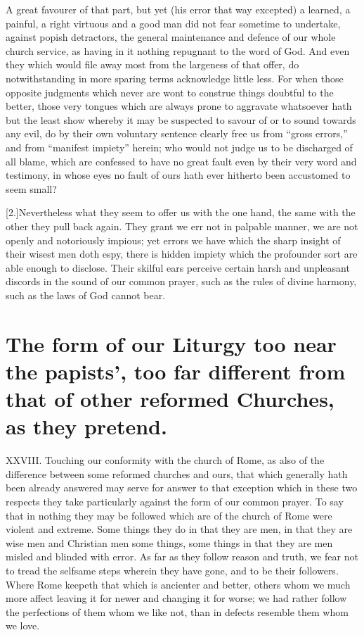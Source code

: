 A great favourer of that part, but yet (his error that way excepted) a learned, a painful, a right virtuous and a good man did not fear sometime to undertake, against popish detractors, the general maintenance and defence of our whole church service, as having in it nothing repugnant to the word of God. And even they which would file away most from the largeness of that offer, do notwithstanding in more sparing terms acknowledge little less. For when those opposite judgments which never are wont to construe things doubtful to the better, those very tongues which are always prone to aggravate whatsoever hath but the least show whereby it may be suspected to savour of or to sound towards any evil, do by their own voluntary sentence clearly free us from “gross errors,” and from “manifest impiety” herein; who would not judge us to be discharged of all blame, which are confessed to have no great fault even by their very word and testimony, in whose eyes no fault of ours hath ever hitherto been accustomed to seem small?

[2.]Nevertheless what they seem to offer us with the one hand, the same with the other they pull back again. They grant we err not in palpable manner, we are not openly and  notoriously impious;
 yet errors we have which the sharp insight of their wisest men doth espy, there is hidden impiety which the profounder sort are able enough to disclose. Their skilful ears perceive certain harsh and unpleasant discords in the sound of our common prayer, such as the rules of divine harmony, such as the laws of God cannot bear.


\section*{The form of our Liturgy too near the papists’, too far different from that of other reformed Churches, as they pretend.}
XXVIII. Touching our conformity with the church of Rome, as also of the difference between some reformed churches and ours, that which generally hath been already answered may serve for answer to that exception which in these two respects they take particularly against the form of our common prayer. To say that in nothing they may be followed which are of the church of Rome were violent and extreme. Some things they do in that they are men, in that they are wise men and Christian men some things, some things in that they are men misled and blinded with error. As far as they follow reason and truth, we fear not to tread the selfsame steps wherein they have gone, and to be their followers. Where Rome keepeth that which is ancienter and better, others whom we much more affect leaving it for newer and changing it for worse; we had rather follow the perfections of them whom we like not, than in defects resemble them whom we love.

